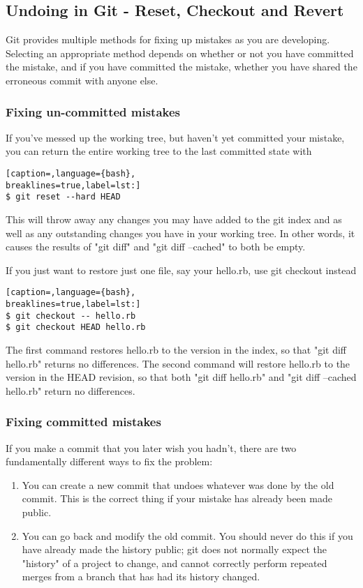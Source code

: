\subsection{Undoing in Git - Reset, Checkout and Revert}
Git provides multiple methods for fixing up mistakes as you are developing.
Selecting an appropriate method depends on whether or not you have committed
the mistake, and if you have committed the mistake, whether you have shared the
erroneous commit with anyone else.

\subsubsection{Fixing un-committed mistakes}
If you've messed up the working tree, but haven't yet committed your mistake,
you can return the entire working tree to the last committed state with
\lstset{basicstyle=\scriptsize, numbers=none, captionpos=b, tabsize=4}
\begin{lstlisting}[caption=,language={bash},
breaklines=true,label=lst:]
$ git reset --hard HEAD
\end{lstlisting}

This will throw away any changes you may have added to the git index and as
well as any outstanding changes you have in your working tree. In other words,
it causes the results of "git diff" and "git diff --cached" to both be empty.

If you just want to restore just one file, say your hello.rb, use git checkout
instead
\lstset{basicstyle=\scriptsize, numbers=none, captionpos=b, tabsize=4}
\begin{lstlisting}[caption=,language={bash},
breaklines=true,label=lst:]
$ git checkout -- hello.rb
$ git checkout HEAD hello.rb
\end{lstlisting}

The first command restores hello.rb to the version in the index, so that "git
diff hello.rb" returns no differences. The second command will restore hello.rb
to the version in the HEAD revision, so that both "git diff hello.rb" and "git
diff --cached hello.rb" return no differences.

\subsubsection{Fixing committed mistakes}
If you make a commit that you later wish you hadn't, there are two
fundamentally different ways to fix the problem:
\begin{enumerate}
\item You can create a new commit that undoes whatever was done by the old commit.
This is the correct thing if your mistake has already been made public.

\item You can go back and modify the old commit. You should never do this if you have
already made the history public; git does not normally expect the "history" of
a project to change, and cannot correctly perform repeated merges from a branch
that has had its history changed.
\end{enumerate}

